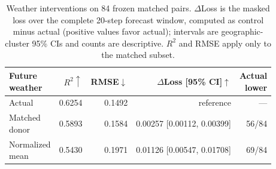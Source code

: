 \begin{table}[t]
\centering
{\small
\setlength{\tabcolsep}{1.5pt}
\begin{tabular}{@{}lrrrr@{}}
\toprule
\shortstack[l]{Future\\weather} & $R^2\uparrow$ & RMSE$\downarrow$ &
$\Delta$Loss [95\% CI]$\uparrow$ & \shortstack{Actual\\lower}\\
\midrule
Actual & 0.6254 & 0.1492 & reference & ---\\
\shortstack[l]{Matched\\donor} & 0.5893 & 0.1584 &
0.00257 [0.00112, 0.00399] & 56/84\\
\shortstack[l]{Normalized\\mean} & 0.5430 & 0.1971 &
0.01126 [0.00547, 0.01708] & 69/84\\
\bottomrule
\end{tabular}
}
\caption{Weather interventions on 84 frozen matched pairs. $\Delta$Loss is the
masked loss over the complete 20-step forecast window, computed as control
minus actual (positive values favor actual); intervals are geographic-cluster
95\% CIs and counts are descriptive. $R^2$ and RMSE apply only to the
matched subset.}
\label{tab:q3}
\end{table}
